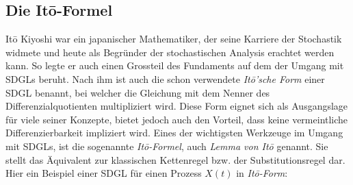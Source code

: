\subsection{Die Itō-Formel\label{brown:ito}}

Itō Kiyoshi war ein japanischer Mathematiker, der seine Karriere der Stochastik widmete und heute als Begründer der stochastischen Analysis erachtet werden kann. So legte er auch einen Grossteil des Fundaments auf dem der Umgang mit SDGLs beruht. Nach ihm ist auch die schon verwendete \textit{Itō'sche Form} einer SDGL benannt, bei welcher die Gleichung mit dem Nenner des Differenzialquotienten multipliziert wird. Diese Form eignet sich als Ausgangslage für viele seiner Konzepte, bietet jedoch auch den Vorteil, dass keine vermeintliche Differenzierbarkeit impliziert wird.
Eines der wichtigsten Werkzeuge im Umgang mit SDGLs, ist die sogenannte \textit{Itō-Formel}, auch \textit{Lemma von Itō} genannt. Sie stellt das Äquivalent zur klassischen Kettenregel bzw. der Substitutionsregel dar. Hier ein Beispiel einer SDGL für einen Prozess $ X(t) $ in \textit{Itō-Form}:



